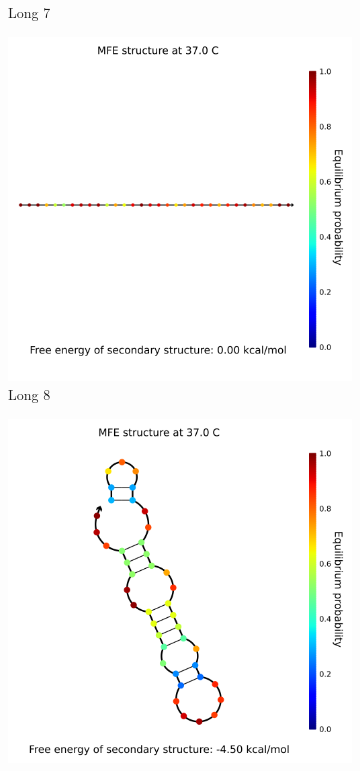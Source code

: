 \begin{figure}
\begin{subfigure}{.32\columnwidth}
  \caption{Long 7}
\end{subfigure}
\begin{subfigure}{.32\columnwidth}
  \centering
  \includegraphics[width=\linewidth]{images/long_rna_secondarystructure_8.png}
  \caption{Long 8}
\end{subfigure}
\begin{subfigure}{.32\columnwidth}
  \centering
  \includegraphics[width=\linewidth]{images/long_rna_secondarystructure_9.png}

\end{subfigure}
\end{figure}
